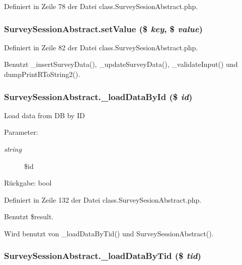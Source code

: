 Definiert in Zeile 78 der Datei class.SurveySesionAbstract.php.
\subsubsection{\setlength{\rightskip}{0pt plus 5cm}SurveySessionAbstract.setValue (\$ {\em key}, \$ {\em value})}\label{classSurveySessionAbstract_04f2da04ad3e299d5b3f6561dad342a9}




Definiert in Zeile 82 der Datei class.SurveySesionAbstract.php.

Benutzt \_\-insertSurveyData(), \_\-updateSurveyData(), \_\-validateInput() und dumpPrintRToString2().
\subsubsection{\setlength{\rightskip}{0pt plus 5cm}SurveySessionAbstract.\_\-loadDataById (\$ {\em id})}\label{classSurveySessionAbstract_d34a109ff92b3e559825099e52d04960}


Load data from DB by ID

\begin{Desc}
\item[Parameter:]
\begin{description}
\item[{\em string}]\$id \end{description}
\end{Desc}
\begin{Desc}
\item[Rückgabe:]bool \end{Desc}


Definiert in Zeile 132 der Datei class.SurveySesionAbstract.php.

Benutzt \$result.

Wird benutzt von \_\-loadDataByTid() und SurveySessionAbstract().
\subsubsection{\setlength{\rightskip}{0pt plus 5cm}SurveySessionAbstract.\_\-loadDataByTid (\$ {\em tid})}\label{classSurveySessionAbstract_5759ff2d2c2afc787e01cc5053471259}




